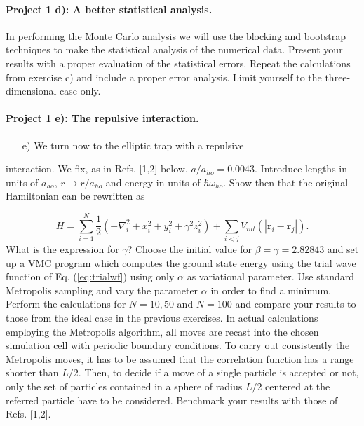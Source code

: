 \documentclass[%
oneside,                 %
final,                   %
10pt]{article}
\begin{document}
\paragraph{Project 1 d): A better statistical analysis.}
In performing the Monte Carlo analysis we will use the 
  blocking and bootstrap techniques to make the statistical analysis of the
  numerical data. Present your results with a proper evaluation of the
  statistical errors. Repeat the calculations from exercise c) and
  include a proper error analysis. Limit yourself to the
  three-dimensional case only.

\paragraph{Project 1 e): The repulsive interaction.}
\begin{itemize}
  \item [e)] We turn now to the elliptic trap with a repulsive
\end{itemize}

\noindent
   interaction.  We fix, as in Refs. [1,2] below,
   $a/a_{ho}=0.0043$. Introduce lengths in units of $a_{ho}$,
   $r\rightarrow r/a_{ho}$ and energy in units of $\hbar\omega_{ho}$.
   Show then that the original Hamiltonian can be rewritten as

\begin{equation*} 
    H=\sum_{i=1}^N\frac{1}{2}\left(-\nabla^2_i+x_i^2+y_i^2+\gamma^2z_i^2\right)+\sum_{i<j}V_{int}(|\mathbf{r}_i-\mathbf{r}_j|).
 \end{equation*}
 What is the expression for $\gamma$?  Choose the initial value for
 $\beta=\gamma = 2.82843$ and set up a VMC program which computes the
 ground state energy using the trial wave function of
 Eq. (\ref{eq:trialwf})  using only $\alpha$ as variational
 parameter.  Use standard Metropolis sampling and vary the parameter
 $\alpha$ in order to find a minimum. Perform the calculations for
 $N=10,50$ and $N=100$ and compare your results to those from the
 ideal case in the previous exercises.  In actual calculations
 employing the Metropolis algorithm, all moves are recast into the
 chosen simulation cell with periodic boundary conditions. To carry
 out consistently the Metropolis moves, it has to be assumed that the
 correlation function has a range shorter than $L/2$. Then, to decide
 if a move of a single particle is accepted or not, only the set of
 particles contained in a sphere of radius $L/2$ centered at the
 referred particle have to be considered.  Benchmark your results with
 those of Refs. [1,2].
\end{document}
